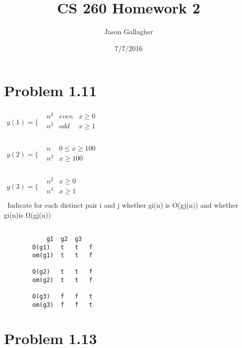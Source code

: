 \documentclass{article}
\begin{document}
		\title{CS 260 Homework 2}
		\date{7/7/2016}
		\author{Jason Gallagher}
		\maketitle

		\section{Problem 1.11}
$
\begin{array}{cc}
   g(1)=\{ & 
    \begin{array}{ccc}
      n^2 & even &  x\geq 0 \\
      n^3 &  odd & x\geq 1 \\
    \end{array}
\end{array}
$

$
\begin{array}{cc}
   g(2)=\{ & 
    \begin{array}{cc}
      n &  0 \leq x \geq 100 \\
      n^3 &  x\geq 100 \\
    \end{array}
\end{array}
$

$
\begin{array}{cc}
   g(3)=\{ & 
    \begin{array}{cc}
      n^2 &  x\geq 0 \\
      n^3 &  x\geq 1 \\
    \end{array}
\end{array}
$
\\
		\ Indicate for each distinct pair i and j whether gi(n) is O(gj(n)) and whether gi(n)is Ω(gj(n))\\
		
		
		\begin{lstlisting}
		
			g1	g2	g3
		O(g1)	t	t	f
		om(g1)	t	t	f
		
		O(g2)	t	t	f
		om(g2)	t	t	f
		
		O(g3)	f	f	t
		om(g3)	f	f	t
		\end{lstlisting}

		\section{Problem 1.13}
\end{document}
